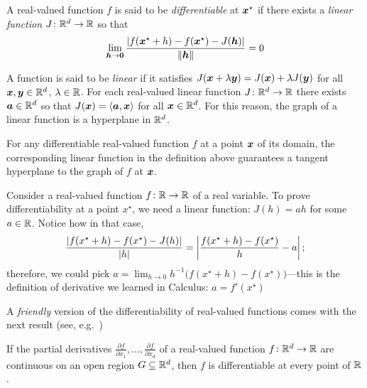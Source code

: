 \begin{definition}\label{def:differentiable}
A real-valued function $f$ is said to be \emph{differentiable} at $\boldsymbol{x}^{\star}$ if there exists a \emph{linear function} $J\colon \mathbb{R}^d \to \mathbb{R}$ so that 
\begin{equation*}
\lim_{\boldsymbol{h} \to \boldsymbol{0}} \frac{\lvert f(\boldsymbol{x}^{\star}+h)-f(\boldsymbol{x}^{\star})-J(\boldsymbol{h}) \rvert}{\lVert \boldsymbol{h} \rVert} = 0
\end{equation*}
\end{definition}

\begin{remark}
A function is said to be \emph{linear} if it satisfies $J(\boldsymbol{x}+\lambda\boldsymbol{y}) = J(\boldsymbol{x}) + \lambda J(\boldsymbol{y})$ for all $\boldsymbol{x}, \boldsymbol{y} \in \mathbb{R}^d$, $\lambda \in \mathbb{R}$.  For each real-valued linear function $J \colon \mathbb{R}^d \to \mathbb{R}$ there exists $\boldsymbol{a} \in \mathbb{R}^d$ so that $J(\boldsymbol{x}) = \langle \boldsymbol{a} , \boldsymbol{x} \rangle$ for all $\boldsymbol{x} \in \mathbb{R}^d$.  For this reason, the graph of a linear function is a hyperplane in $\mathbb{R}^d$.
\end{remark}

\begin{remark}
For any differentiable real-valued function $f$ at a point $\boldsymbol{x}$ of its domain, the corresponding linear function in the definition above guarantees a tangent hyperplane to the graph of $f$ at $\boldsymbol{x}$.  
\end{remark}
 
\begin{example}\label{example:derivatives}
Consider a real-valued function $f\colon \mathbb{R} \to \mathbb{R}$ of a real variable. To prove differentiability at a point $x^\star$, we need a linear function: $J(h)=ah$ for some $a\in \mathbb{R}$. Notice how in that case, 
\begin{equation*}
\frac{\lvert f(x^\star+h)-f(x^\star)-J(h) \rvert}{\lvert h \rvert} = \left\lvert \frac{f(x^\star+h)-f(x^\star)}{h} - a \right\lvert;
\end{equation*}
therefore, we could pick $a = \lim_{h\to 0} h^{-1}\big( f(x^\star+h) - f(x^\star) \big)$---this is the definition of derivative we learned in Calculus: $a=f'(x^\star)$
\end{example}

\separator 

A \emph{friendly} version of the differentiability of real-valued functions comes with the next result (see, e.g.~\cite[p.818]{finney2001thomas})
\begin{theorem}\label{theorem:partialgivesDerivative}
If the partial derivatives $\frac{\partial f}{\partial x_1}, \dotsc, \frac{\partial f}{\partial x_d}$ of a real-valued function $f \colon \mathbb{R}^d \to \mathbb{R}$ are continuous on an open region $G \subseteq \mathbb{R}^d$, then $f$ is differentiable at every point of $\mathbb{R}$.
\end{theorem}

